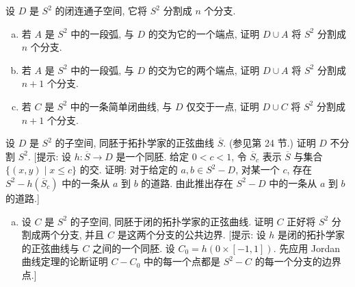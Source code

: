 \begin{exercise}\label{ch10:ex-jordan-curve-2}
设 $D$ 是 $S^{2}$ 的闭连通子空间, 它将 $S^{2}$ 分割成 $n$ 个分支.

\begin{enumerate}[(a)]
\item 若 $A$ 是 $S^{2}$ 中的一段弧, 与 $D$ 的交为它的一个端点, 证明 $D\cup A$ 将 $S^{2}$ 分割成 $n$ 个分支.
\item 若 $A$ 是 $S^{2}$ 中的一段弧, 与 $D$ 的交为它的两个端点, 证明 $D\cup A$ 将 $S^{2}$ 分割成 $n+1$ 个分支.
\item 若 $C$ 是 $S^{2}$ 中的一条简单闭曲线, 与 $D$ 仅交于一点, 证明 $D\cup C$ 将 $S^{2}$ 分割成 $n+1$ 个分支.
\end{enumerate}
\end{exercise}

\begin{exercise}\label{ch10:ex-jordan-curve-3}
设 $D$ 是 $S^{2}$ 的子空间, 同胚于拓扑学家的正弦曲线 $\overline{S}$. (参见第 24 节.) 证明 $D$ 不分割 $S^{2}$. [提示: 设 $h\colon\overline{S}\to D$ 是一个同胚. 给定 $0<c<1$, 令 $\overline{S}_{c}$ 表示 $\overline{S}$ 与集合 $\{(x,y)\mid x\leqslant c\}$ 的交. 证明: 对于给定的 $a,b\in S^{2}-D$, 对某一个 $c$, 存在 $S^{2}-h(\overline{S}_{c})$ 中的一条从 $a$ 到 $b$ 的道路. 由此推出存在 $S^{2}-D$ 中的一条从 $a$ 到 $b$ 的道路.]
\end{exercise}
\begin{enumerate}[(b)]
\item 设 $C$ 是 $S^{2}$ 的子空间, 同胚于闭的拓扑学家的正弦曲线. 证明 $C$ 正好将 $S^{2}$ 分割成两个分支, 并且 $C$ 是这两个分支的公共边界. [提示: 设 $h$ 是闭的拓扑学家的正弦曲线与 $C$ 之间的一个同胚. 设 $C_{0}=h(0\times[-1,1])$. 先应用 Jordan 曲线定理的论断证明 $C-C_{0}$ 中的每一个点都是 $S^{2}-C$ 的每一个分支的边界点.]
\end{enumerate}

